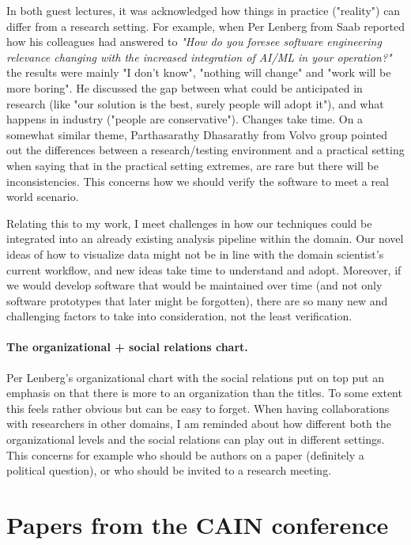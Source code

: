 \documentclass[11pt]{article}
\begin{document}
In both guest lectures, it was acknowledged how things in practice ("reality") can differ from a research setting.
For example, when Per Lenberg from Saab reported how his colleagues had answered to \textit{"How do you foresee software engineering relevance changing with the increased integration of AI/ML in your operation?"} the results were mainly "I don't know", "nothing will change" and "work will be more boring". He discussed the gap between what could be anticipated in research (like "our solution is the best, surely people will adopt it"), and what happens in industry ("people are conservative"). Changes take time.
On a somewhat similar theme, Parthasarathy Dhasarathy from Volvo group pointed out the differences between a research/testing environment and a practical setting when saying that in the practical setting extremes, are rare but there will be inconsistencies. This concerns how we should verify the software to meet a real world scenario.

Relating this to my work, I meet challenges in how our techniques could be integrated into an already existing analysis pipeline within the domain. 
Our novel ideas of how to visualize data might not be in line with the domain scientist's current workflow, and new ideas take time to understand and adopt.
Moreover, if we would develop software that would be maintained over time (and not only software prototypes that later might be forgotten), there are so many new and challenging factors to take into consideration, not the least verification.

\paragraph*{The organizational + social relations chart.}

Per Lenberg's organizational chart with the social relations put on top put an emphasis on that there is more to an organization than the titles. 
To some extent this feels rather obvious but can be easy to forget.
When having collaborations with researchers in other domains, I am reminded about how different both the organizational levels and the social relations can play out in different settings. This concerns for example who should be authors on a paper (definitely a political question), or who should be invited to a research meeting. 



\section{Papers from the CAIN conference}
\end{document}
